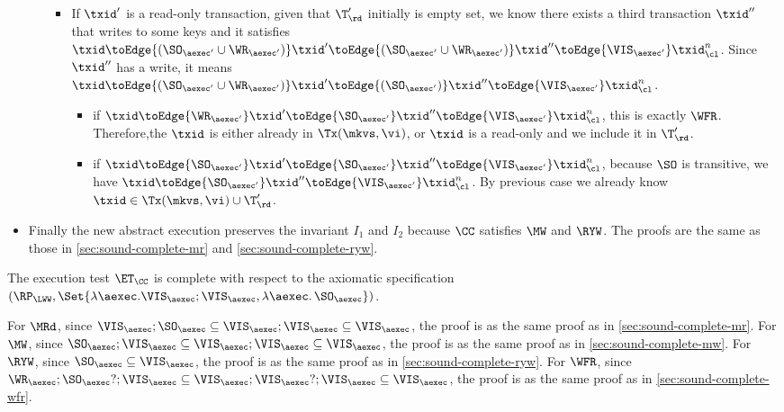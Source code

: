 \begin{itemize}
\begin{itemize}
\begin{itemize}
        \item If \( \txid' \) is a read-only transaction,
        given that \( \T'_\rd \) initially is empty set,
        we know there exists a third transaction \( \txid'' \) that writes to some keys
        and it satisfies \( \txid \toEdge{( \SO_{\aexec'} \cup \WR_{\aexec'} )}  \txid' \toEdge{( \SO_{\aexec'} \cup \WR_{\aexec'} )}  \txid'' \toEdge{\VIS_{\aexec'}} \txid_\cl^n \).
        Since \( \txid'' \) has a write, it means 
        \( \txid \toEdge{( \SO_{\aexec'} \cup \WR_{\aexec'} )}  \txid' \toEdge{( \SO_{\aexec'} )}  \txid'' \toEdge{\VIS_{\aexec'}} \txid_\cl^n \).
        \begin{itemize}
            \item if \( \txid \toEdge{\WR_{\aexec'} }  \txid' \toEdge{ \SO_{\aexec'} }  \txid'' \toEdge{\VIS_{\aexec'}} \txid_\cl^n \),
            this is exactly \( \WFR \).
            Therefore,the \( \txid \) is either already in \( \Tx(\mkvs, \vi) \), 
            or \( \txid \) is a read-only and we include it in \( \T'_\rd \).

            \item if \( \txid \toEdge{\SO_{\aexec'} }  \txid' \toEdge{ \SO_{\aexec'} }  \txid'' \toEdge{\VIS_{\aexec'}} \txid_\cl^n \),
            because \( \SO \) is transitive, we have \( \txid \toEdge{\SO_{\aexec'}} \txid'' \toEdge{\VIS_{\aexec'}} \txid_\cl^n \).
            By previous case we already know \( \txid \in \Tx(\mkvs, \vi) \cup \T'_\rd \).
        \end{itemize}
    \end{itemize}
    \end{itemize}
    \item Finally the new abstract execution preserves the invariant \( I_1 \) and \( I_2 \) 
    because  \( \CC \) satisfies \( \MW \) and \( \RYW \).
    The proofs are the same as those in \cref{sec:sound-complete-mr} and \cref{sec:sound-complete-ryw}.

\end{itemize}

The execution test $\ET_\CC$ is complete with respect to the axiomatic specification 
\( (\RP_{\LWW}, \Set{\lambda \aexec. \VIS_{\aexec} ; \VIS_{\aexec}, \lambda \aexec \ldotp \SO_\aexec })\).

For \( \MRd \), since \(  \VIS_\aexec ; \SO_\aexec \subseteq  \VIS_\aexec ; \VIS_{\aexec} \subseteq \VIS_\aexec \),
the proof is as the same proof as in \cref{sec:sound-complete-mr}.
For \( \MW \), since \( \SO_\aexec ; \VIS_\aexec \subseteq  \VIS_\aexec ; \VIS_{\aexec} \subseteq \VIS_\aexec \),
the proof is as the same proof as in \cref{sec:sound-complete-mw}.
For \( \RYW \), since \( \SO_\aexec \subseteq \VIS_\aexec \),
the proof is as the same proof as in \cref{sec:sound-complete-ryw}.
For \( \WFR \), since \( \WR_\aexec ; \SO_\aexec? ; \VIS_\aexec \subseteq \VIS_\aexec ; \VIS_{\aexec}? ; \VIS_\aexec \subseteq \VIS_\aexec \),
the proof is as the same proof as in \cref{sec:sound-complete-wfr}.
